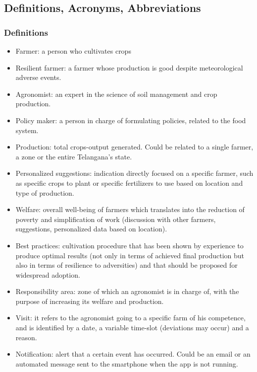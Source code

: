 \documentclass{article}
\begin{document}
\subsection{Definitions, Acronyms, Abbreviations}

\subsubsection{Definitions}

    \begin{itemize}
        \item Farmer: a person who cultivates crops

        \item Resilient farmer: a farmer whose production is good despite meteorological adverse events.
        
        \item Agronomist: an expert in the science of soil management and crop production.
        
        \item Policy maker: a person in charge of formulating policies, related to the food system. 
        
        \item Production: total crops-output generated. Could be related to a single farmer, a zone or the entire Telangana’s state.
        
        \item Personalized suggestions: indication directly focused on a specific farmer, such as specific crops to plant or specific fertilizers to use based on location and type of production.
        
        \item Welfare: overall well-being of farmers which translates into the reduction of poverty and  simplification of work (discussion with other farmers,  suggestions, personalized data based on location).
        
        \item Best practices: cultivation procedure that has been shown by experience to produce optimal results (not only in terms of achieved final production but also in terms of resilience to adversities)  and that should be proposed for widespread adoption.
        
        \item Responsibility area: zone of which an agronomist is in charge of, with the purpose of increasing its welfare and production.
        
        \item Visit: it refers to the agronomist going to a specific farm of his competence, and is identified by a date, a variable time-slot (deviations may occur) and a reason.
        
        \item Notification: alert that a certain event has occurred. Could be an email or an automated message sent to the smartphone when the app is not running.

    \end{itemize}
\end{document}
